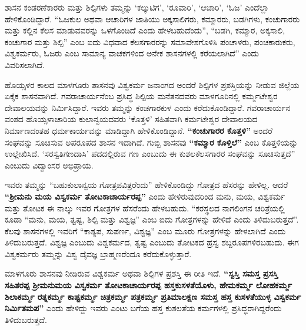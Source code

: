 ಶಾಸನ ಕಂಡರಣೆಕಾರರು ಮತ್ತು ಶಿಲ್ಪಿಗಳು ತಮ್ಮನ್ನು ‘ಕಲ್ಕುಟಿಗ’, ‘ರೂವಾರಿ’, ‘ಆಚಾರಿ’, ‘ಓಜ’ ಎಂದೆಲ್ಲಾ ಹೇಳಿಕೊಂಡಿದ್ದಾರೆ. “ಓಜಕುಲ ಅಥವಾ ಆಚಾರಿಗಳ ಜಾತಿಯು ಅಕ್ಕಸಾಲಿಗರು, ಕಮ್ಮಾರರು, ಬಡಗಿಗಳು, ಕಂಚುಗಾರರು ಮತ್ತು ಕಲ್ಲಿನ ಕೆಲಸ ಮಾಡುವವರನ್ನು ಒಳಗೊಂಡಿದೆ ಎಂದು ಹೇಳಬಹುದೆಂದು”, “ಬಡಗಿ, ಕಮ್ಮಾರ, ಅಕ್ಕಸಾಲಿ, ಕಂಚುಗಾರ ಮತ್ತು ಶಿಲ್ಪಿ” ಎಂಬ ಐದು ವಿಧವಾದ ಕೆಲಸಗಾರರನ್ನು ಸಮಾವೇಶಗೊಳಿಸಿ ಪಂಚಾಳರು, ಪಂಚಕಾರುಕರು, ವಿಶ್ವಕರ್ಮರು, ಓಜರು ಎಂಬ ಸಾಮಾನ್ಯ ವಾಚಕಗಳಿಂದ ಅನೇಕ ಶಾಸನಗಳಲ್ಲಿ ಕರೆಯಲಾಗಿದೆ” ಎಂದು ವಿವರಿಸಲಾಗಿದೆ.

ಹೊಯ್ಸಳರ ಕಾಲದ ಮಾಳಗೂರು ಶಾಸನವು ವಿಶ್ವಕರ್ಮ ಜನಾಂಗದ ಅಂದರೆ ಶಿಲ್ಪಿಗಳ ಪ್ರಶಸ್ತಿಯನ್ನು ನೀಡುವ ಜಿಲ್ಲೆಯ ಏಕೈಕ ಶಾಸನವಾಗಿದೆ. ಗವರಾಚಾರ್ಯನೆಂಬ ಪ್ರಸಿದ್ಧ ಶಿಲ್ಪಿಯ ಮನೆತನದವರು ಮಾಳಗೂರಿನಲ್ಲಿ ಕರ್ಮ್ಮಟೇಶ್ವರ ದೇವಾಲಯವನ್ನು ನಿರ್ಮಿಸಿದ್ದಾರೆ. ಇವರು ತಮ್ಮನ್ನು ಕಂಚಗಾರಕುಳ ಎಂದು ಕರೆದುಕೊಂಡಿದ್ದಾರೆ. ಗವರಾಚಾರ್ಯನ ವಂಶದ ಹೊಯ್ಸಳಾಚಾರಿಯ ಕುಲಾನ್ವಯದವರು ‘ಕೊತ್ತಳಿ’ ಸಹಿತವಾಗಿ ಕರ್ಮಟೇಶ್ವರ ದೇವಾಲಯದ ನಿರ್ಮಾಣದಂತಹ ಧರ್ಮಕಾರ್ಯವನ್ನು ಮಾಡಿದ್ದಾಗಿ ಹೇಳಿಕೊಂಡಿದ್ದಾನೆ.\textbf{ “ಕಂಚುಗಾರರ ಕೊತ್ತಳಿ”} ಅಂದರೆ ಸಂಘವನ್ನು ಸೂಚಿಸುವ ಅಪರೂಪದ ಶಾಸನ ಇದಾಗಿದೆ. ಗುಬ್ಬಿ ಶಾಸನವು \textbf{“ಕಮ್ಮಾರ ಕೊಳ್ತಿಲೆ”} ಎಂಬ ಕೊತ್ತಳಿಯನ್ನು ಉಲ್ಲೇಖಿಸಿದೆ. ‘ಸರಸ್ವತಿಗಣದಾಸಿ’ ಪದದಲ್ಲಿರುವ ಗಣ ಎಂಬುದು ಈ ಕುಶಲಕೆಲಸಗಾರರ ಸಂಘವನ್ನು ಸೂಚಿಸುತ್ತದೆ” ಎಂಬುದು ವಿದ್ವಾಂಸರ ಅಭಿಪ್ರಾಯ.

ಇವರು ತಮ್ಮನ್ನು “ಬಹುಕುಲಾನ್ವಯ ಗೋತ್ರಪವಿತ್ರರೆಂದು” ಹೇಳಿಕೊಂಡಿದ್ದು ಗೋತ್ರದ ಹೆಸರನ್ನು ಹೇಳಿಲ್ಲ. ಆದರೆ \textbf{“ಶ‍್ರೀಮನು ಮಯ ವಿಸ್ವಕರ್ಮ ತೋಟಕಾಚಾರ್ಯರಪ್ಪ”} ಎಂದು ಹೇಳಿರುವುದರಿಂದ ಮನು, ಮಯ, ವಿಶ್ವಕರ್ಮ ಮತ್ತು ತೋಟಕ ಈ ನಾಲ್ಕು ಇವರ ಗೋತ್ರಗಳ ಹೆಸರೆಂದು ಹೇಳಬಹುದು. “ಕರಸ್ಥಲದ ನಾಗಲಿಂಗನ ಚರಿತ್ರೆಯಲ್ಲಿ ಕೂಡಾ “ಮನು, ಮಯ, ತ್ವಷ್ಟ, ಶಿಲ್ಪಿ ಮತ್ತು ವಿಶ್ವಜ್ಞ” ಎಂಬ ಐದು ಗೋತ್ರಗಳನ್ನು ಹೇಳಿದೆ ಎಂದು ತಿಳಿದುಬರುತ್ತದೆ”. ಕೆಲವು ಶಾಸನಗಳಲ್ಲಿ ಇವರಿಗೆ “ಕಾಶ್ಯಪ, ಸುಪರ್ಣ, ವಿಶ್ವಜ್ಞ” ಎಂಬ ಮೂರು ಗೋತ್ರಗಳನ್ನು ಹೇಳಲಾಗಿದೆ ಎಂದು ತಿಳಿದುಬರುತ್ತದೆ. ವಿಶ್ವಜ್ಞ ಎಂಬುದು ವಿಶ್ವಕರ್ಮದ, ತ್ವಷ್ಟ ಎಂಬುದು ತೋಟಕದ ಹ್ರಸ್ವ ಶಬ್ದರೂಪಗಳಿರಬಹುದು. ಈಗ ವಿಶ್ವಕರ್ಮರು ತಮ್ಮನ್ನು ವಿಶ್ವ ದೈವಜ್ಞ ಬ್ರಾಹ್ಮಣರೆಂದೂ ಕರೆದುಕೊಳ್ಳುತ್ತಾರೆ.

ಮಾಳಗೂರು ಶಾಸನವು ನೀಡಿರುವ ವಿಶ್ವಕರ್ಮ ಅಥವಾ ಶಿಲ್ಪಿಗಳ ಪ್ರಶಸ್ತಿ ಈ ರೀತಿ ಇದೆ. \textbf{“ಸ್ವಸ್ತಿ ಸಮಸ್ತ ಪ್ರಸಸ್ತಿ ಸಹಿತರಪ್ಪ ಶ‍್ರೀಮನುಮಯ ವಿಸ್ವಕರ್ಮ ತೋಟಕಾಚಾರ್ಯರಪ್ಪ ಹಸ್ತಕುಸಳತೆಯೊಳು, ಹೇಮಕರ್ಮ್ಮ ಲೋಹಕರ್ಮ್ಮ ಶಿಲಾಕರ್ಮ್ಮ ರತ್ನಕರ್ಮ್ಮ ಕಾಷ್ಟಕರ್ಮ್ಮ ಚಿತ್ರಕರ್ಮ್ಮ ಪತ್ರಕರ್ಮ್ಮ ಪ್ರತಿಮಾಲಕ್ಷಣ ಸಮಸ್ತ ಹಸ್ತ ಕುಸಳತೆಯುಳ್ಳ ವಿಸ್ವಕರ್ಮ ನಿರ್ಮಿತಮಪ”} ಎಂದು ಹೇಳಿದ್ದು ಇವರು ಎಂಟು ಬಗೆಯ ಹಸ್ತ ಕುಶಲತೆಯ ಕರ್ಮಗಳಲ್ಲಿ ಪ್ರಸಿದ್ಧರಾಗಿದ್ದರೆಂದು ತಿಳಿದು\break ಬರುತ್ತದೆ.

